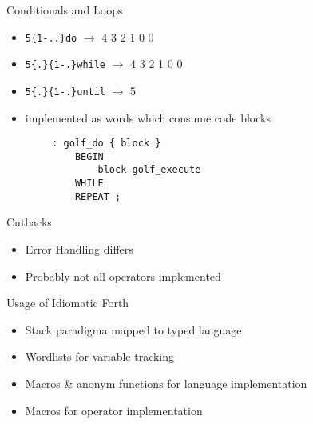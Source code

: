 \documentclass{beamer}
\begin{document}
\begin{frame}[fragile]
    \vspace{0.5cm}
    Conditionals and Loops

    \begin{itemize}
        \item \texttt{5\{1-..\}do} $\rightarrow$ 4 3 2 1 0 0
        \item \texttt{5\{.\}\{1-.\}while}  $\rightarrow$  4 3 2 1 0 0
        \item \texttt{5\{.\}\{1-.\}until}  $\rightarrow$  5
        \item implemented as words which consume code blocks
    \end{itemize}
    \begin{verbatim}
        : golf_do { block }
            BEGIN
                block golf_execute
            WHILE
            REPEAT ;
    \end{verbatim}
\end{frame}


\begin{frame}
    Cutbacks
    \begin{itemize}
    \item Error Handling differs
    \item Probably not all operators implemented
    \end{itemize}
\end{frame}


\begin{frame}
    Usage of Idiomatic Forth
    \begin{itemize}
    \item Stack paradigma mapped to typed language
    \item Wordlists for variable tracking 
    \item Macros \& anonym functions for language implementation
    \item Macros for operator implementation
    \end{itemize}
\end{frame}
\end{document}
